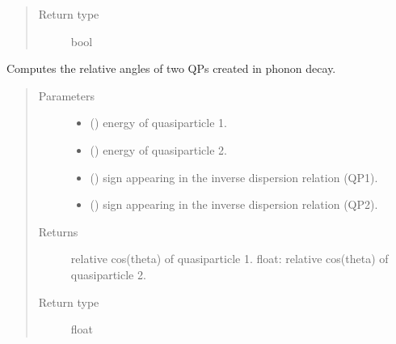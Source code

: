 \documentclass[letterpaper,10pt,english]{sphinxmanual}
\begin{document}
\begin{fulllineitems}
\begin{fulllineitems}
\begin{quote}
\begin{description}
\item[{Return type}] \leavevmode
bool

\end{description}\end{quote}

\end{fulllineitems}


\begin{fulllineitems}
\label{\detokenize{code_structure:scdc.interaction.PhononDecayToQuasiparticles.decay_angles}}
Computes the relative angles of two QPs created in phonon decay.
\begin{quote}\begin{description}
\item[{Parameters}] \leavevmode\begin{itemize}
\item {} 
 () \textendash{} energy of quasiparticle 1.

\item {} 
 () \textendash{} energy of quasiparticle 2.

\item {} 
 () \textendash{} sign appearing in the inverse dispersion relation (QP1).

\item {} 
 () \textendash{} sign appearing in the inverse dispersion relation (QP2).

\end{itemize}

\item[{Returns}] \leavevmode
relative cos(theta) of quasiparticle 1.
float: relative cos(theta) of quasiparticle 2.

\item[{Return type}] \leavevmode
float


\end{description}
\end{quote}
\end{fulllineitems}
\end{fulllineitems}
\end{document}
